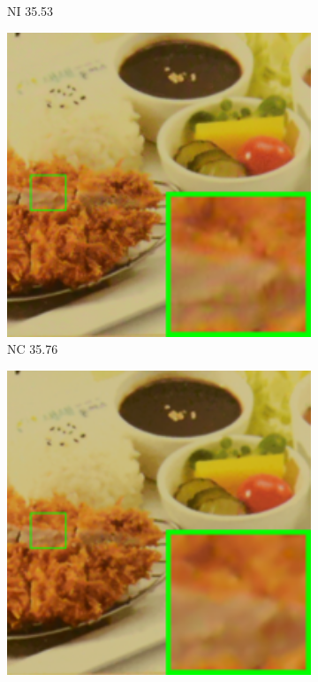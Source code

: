 \begin{figure}
\begin{subfigure}[t]{0.19\textwidth}
\caption{NI 35.53}
    \end{subfigure}
\hfill
    \begin{subfigure}[t]{0.19\textwidth}
        \centering
        \includegraphics[width=1\textwidth]{images/mcwnnm/cc/resize_br_NC_CC15_d800_iso3200_2.png}
		\caption{NC 35.76}
    \end{subfigure}
    \hfill
    \begin{subfigure}[t]{0.19\textwidth}
        \centering
        \includegraphics[width=1\textwidth]{images/mcwnnm/cc/resize_br_CC_d800_iso3200_2.png}

\end{subfigure}
\end{figure}
